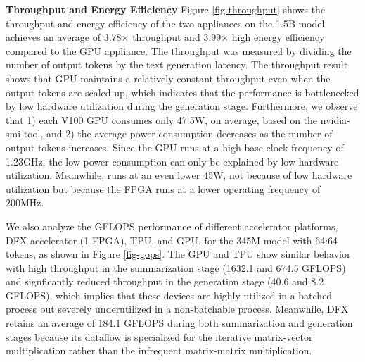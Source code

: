 



\textbf{Throughput and Energy Efficiency} 
Figure \ref{fig-throughput} shows the throughput and energy efficiency of the two appliances on the 1.5B model. \sysname{} achieves an average of 3.78$\times$ throughput and 3.99$\times$ high energy efficiency compared to the GPU appliance. The throughput was measured by dividing the number of output tokens by the text generation latency. The throughput result shows that GPU maintains a relatively constant throughput even when the output tokens are scaled up, which indicates that the performance is bottlenecked by low hardware utilization during the generation stage. Furthermore, we observe that 1) each V100 GPU consumes only 47.5W, on average, based on the nvidia-smi tool, and 2) the average power consumption decreases as the number of output tokens increases. Since the GPU runs at a high base clock frequency of 1.23GHz, the low power consumption can only be explained by low hardware utilization. Meanwhile, \sysname{} runs at an even lower 45W, not because of low hardware utilization but because the FPGA runs at a lower operating frequency of 200MHz.


We also analyze the GFLOPS performance of different accelerator platforms, DFX accelerator (1 FPGA), TPU, and GPU, for the 345M model with 64:64 tokens, as shown in Figure \ref{fig-gops}. The GPU and TPU show similar behavior with high throughput in the summarization stage (1632.1 and 674.5 GFLOPS) and signficantly reduced throughput in the generation stage (40.6 and 8.2 GFLOPS), which implies that these devices are highly utilized in a batched process but severely underutilized in a non-batchable process. Meanwhile, DFX retains an average of 184.1 GFLOPS during both summarization and generation stages because its dataflow is specialized for the iterative matrix-vector multiplication rather than the infrequent matrix-matrix multiplication.


